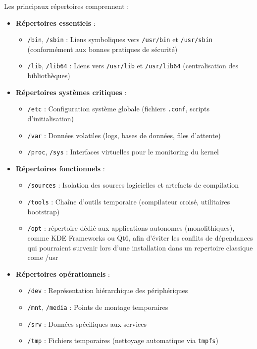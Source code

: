 Les principaux répertoires comprennent :

\begin{itemize}
    \item \textbf{Répertoires essentiels} :
    \begin{itemize}
        \item \texttt{/bin}, \texttt{/sbin} : Liens symboliques vers \texttt{/usr/bin} et \texttt{/usr/sbin} (conformément aux bonnes pratiques de sécurité)
        \item \texttt{/lib}, \texttt{/lib64} : Liens vers \texttt{/usr/lib} et \texttt{/usr/lib64} (centralisation des bibliothèques)
    \end{itemize}
    
    \item \textbf{Répertoires systèmes critiques} :
    \begin{itemize}
        \item \texttt{/etc} : Configuration système globale (fichiers \texttt{.conf}, scripts d'initialisation)
        \item \texttt{/var} : Données volatiles (logs, bases de données, files d'attente)
        \item \texttt{/proc}, \texttt{/sys} : Interfaces virtuelles pour le monitoring du kernel
    \end{itemize}
    
    \item \textbf{Répertoires fonctionnels} :
    \begin{itemize}
        \item \texttt{/sources} : Isolation des sources logicielles et artefacts de compilation
        \item \texttt{/tools} : Chaîne d'outils temporaire (compilateur croisé, utilitaires bootstrap)
       \item \texttt{/opt} : répertoire dédié aux applications autonomes (monolithiques), comme KDE Frameworks ou Qt6, afin d’éviter les conflits de dépendances qui pourraient survenir lors d’une installation dans un repertoire classique come /usr 

    \end{itemize}
    
    \item \textbf{Répertoires opérationnels} :
    \begin{itemize}
        \item \texttt{/dev} : Représentation hiérarchique des périphériques
        \item \texttt{/mnt}, \texttt{/media} : Points de montage temporaires
        \item \texttt{/srv} : Données spécifiques aux services 
        \item \texttt{/tmp} : Fichiers temporaires (nettoyage automatique via \texttt{tmpfs})
    \end{itemize}
\end{itemize}

